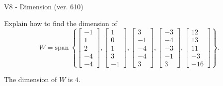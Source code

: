 \begin{exercise}
  \begin{exerciseTitle}V8 - Dimension (ver. 610)\end{exerciseTitle}
  \begin{exerciseStatement}
    Explain how to find the dimension of 
\[W=\mathrm{span}\ \left\{\left[\begin{array}{r}
-1 \\
1 \\
2 \\
-4 \\
-4
\end{array}\right] , \left[\begin{array}{r}
1 \\
0 \\
1 \\
3 \\
-1
\end{array}\right] , \left[\begin{array}{r}
3 \\
-1 \\
-4 \\
-4 \\
3
\end{array}\right] , \left[\begin{array}{r}
-3 \\
-4 \\
-3 \\
-1 \\
3
\end{array}\right] , \left[\begin{array}{r}
12 \\
13 \\
11 \\
-3 \\
-16
\end{array}\right]\right\}.\]



  \end{exerciseStatement}
  \begin{exerciseAnswer}
   The dimension of \(W\) is  \(4\).
  


  \end{exerciseAnswer}
\end{exercise}